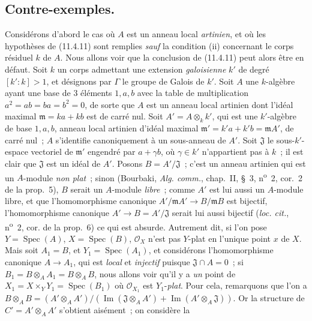\subsection{Contre-exemples.}
\label{subsection:IV.11.7-fr}

\begin{env}[11.7.1]
\label{IV.11.7.1-fr}
Considérons d'abord le cas où $A$ est un anneau local \emph{artinien}, et où les
hypothèses de (11.4.11) sont remplies \emph{sauf} la condition (ii) concernant
le corps résiduel $k$ de $A$. Nous allons voir que la conclusion de (11.4.11)
peut alors être en défaut. Soit $k$ un corps admettant une extension
\emph{galoisienne} $k'$ de degré $[k':k]>1$, et désignons par $\Gamma$ le groupe
de Galois de $k'$. Soit $A$ une $k$-algèbre ayant une base de 3 éléments
$1,a,b$ avec la table de multiplication $a^2=ab=ba=b^2=0$, de sorte que $A$ est
un anneau local artinien dont l'idéal maximal $\mathfrak m=ka+kb$ est de carré
nul. Soit $A'=A\otimes_k k'$, qui est une $k'$-algèbre de base $1,a,b$, anneau
local artinien d'idéal maximal
$\mathfrak m'=k'a+k'b=\mathfrak m A'$, de carré nul~; $A$ s'identifie
canoniquement à un sous-anneau de $A'$. Soit $\mathfrak J$ le sous-$k'$-espace
vectoriel de $\mathfrak m'$ engendré par $a+\gamma b$, où $\gamma\in k'$
n'appartient pas à $k$~; il est clair que $\mathfrak J$ est un idéal de $A'$.
Posons $B=A'/\mathfrak J$~; c'est un anneau artinien qui est un $A$-module
\emph{non plat}~; sinon (Bourbaki, \emph{Alg. comm.}, chap.~II, \S~3,
n\textsuperscript{o}~2, cor.~2 de la prop.~5), $B$ serait un $A$-module \emph{libre}~;
comme $A'$ est lui aussi un $A$-module libre, et que l'homomorphisme canonique
$A'/\mathfrak m A'\to B/\mathfrak m B$ est bijectif, l'homomorphisme canonique
$A'\to B=A'/\mathfrak J$ serait lui
aussi bijectif (\emph{loc. cit.}, n\textsuperscript{o}~2, cor. de la prop.~6) ce qui est
absurde. Autrement dit, si l'on pose $Y=\operatorname{Spec}(A)$,
$X=\operatorname{Spec}(B)$, $\mathcal O_X$ n'est pas $Y$-plat en l'unique point
$x$ de $X$. Mais soit $A_1=B$, et $Y_1=\operatorname{Spec}(A_1)$, et considérons
l'homomorphisme canonique $A\to A_1$, qui est \emph{local} et \emph{injectif} puisque
$\mathfrak J\cap A=0$~; si
$B_1=B\otimes_A A_1=B\otimes_A B$, nous allons voir qu'il y a \emph{un} point de
$X_1=X\times_Y Y_1=\operatorname{Spec}(B_1)$ où $\mathcal O_{X_1}$ est
$Y_1$-\emph{plat}. Pour cela, remarquons que l'on a
$B\otimes_A B=(A'\otimes_A A')/(\operatorname{Im}(\mathfrak J\otimes_A A')+\operatorname{Im}(A'\otimes_A\mathfrak J))$.
Or la structure de $C'=A'\otimes_A A'$ s'obtient aisément~; on considère la

\end{env}
